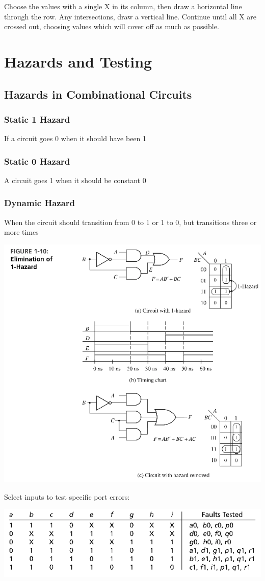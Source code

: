 \documentclass[11pt]{article}
\begin{document}
{    Choose the values with a single X in its column, then draw a horizontal line through the row. Any intersections, draw a vertical line. Continue until all X are crossed out, choosing values which will cover off as much as possible.

    \pagebreak
    \section{Hazards and Testing}
    \subsection{Hazards in Combinational Circuits}
    \subsubsection{Static 1 Hazard}
    If a circuit goes 0 when it should have been 1
    \subsubsection{Static 0 Hazard}
    A circuit goes 1 when it should be constant 0
    \subsubsection{Dynamic Hazard}
    When the circuit should transition from 0 to 1 or 1 to 0, but transitions three or more times

    \begin{center}
        \includegraphics[width=300 px]{hazard} 
    \end{center} 

    Select inputs to test specific port errors:

    \begin{center}
        \includegraphics[width=300 px]{test} 
    \end{center}   

}
\end{document}
